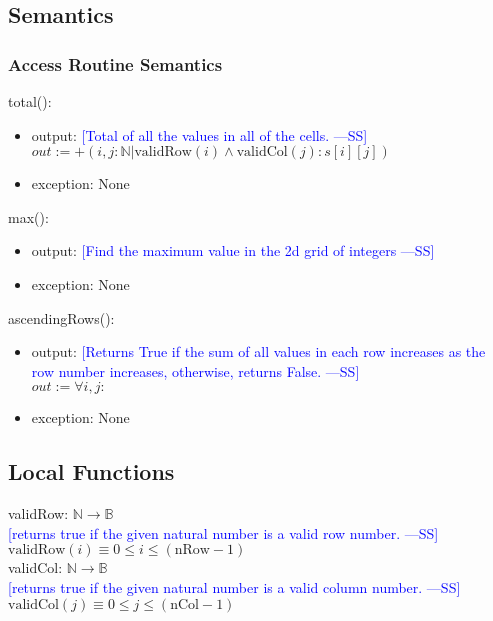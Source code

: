 \documentclass[12pt]{article}
\newcommand{\authornote}[3]{\textcolor{#1}{[#3 ---#2]}}
\newcommand{\authornote}[3]{}
\newcommand{\wss}[1]{\authornote{blue}{SS}{#1}}
\begin{document}
\subsection* {Semantics}

\subsubsection* {Access Routine Semantics}

\noindent total():
\begin{itemize}
\item output: \wss{Total of all the values in all of the cells.}\\
$out := +(i,j : \mathbb{N}| \mbox{validRow}(i) \land  \mbox{validCol}(j) : s[i][j])$
\item exception: None
\end{itemize}

\noindent max():
\begin{itemize}
\item output: \wss{Find the maximum value in the 2d grid of integers}
\item exception: None
\end{itemize}

\noindent ascendingRows():
\begin{itemize}
\item output: \wss{Returns True if the sum of all values in each row increases
    as the row number increases, otherwise, returns False.}\\
$out := \forall i, j: $
\item exception: None
\end{itemize}

\subsection*{Local Functions}

\noindent validRow: $\mathbb{N} \rightarrow \mathbb{B}$\\
\noindent \wss{returns true if the given natural number is a valid row number.}\\ 
$\mbox{validRow}(i) \equiv 0 \le i \le (\mbox{nRow} - 1)$ \\

\noindent validCol: $\mathbb{N} \rightarrow \mathbb{B}$\\
\noindent \wss{returns true if the given natural number is a valid column
  number.}\\
$\mbox{validCol}(j) \equiv 0 \le j \le (\mbox{nCol} - 1)$ \\
\end{document}
